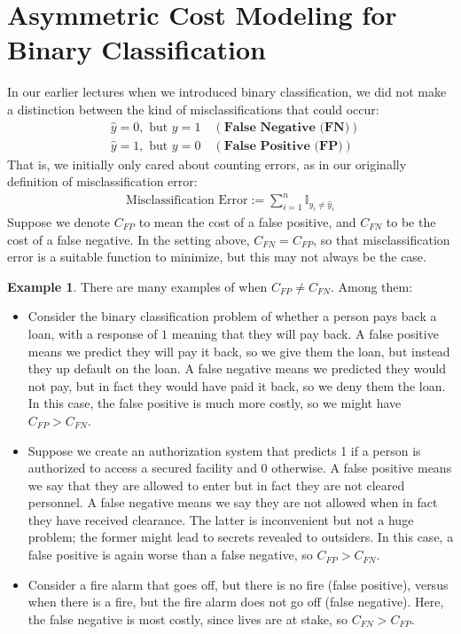 \documentclass[12pt, a4paper]{article}
\theoremstyle{definition}
\newtheorem*{example}{Example}
\begin{document}
	\section{Asymmetric Cost Modeling for Binary Classification}
	In our earlier lectures when we introduced binary classification, we did not
	make a distinction between the kind of misclassifications that could occur:
	\begin{align*}
		&\hat{y} = 0,\text{ but } y = 1\quad (\textbf{False Negative (FN)})\\
		&\hat{y} = 1,\text{ but } y = 0\quad (\textbf{False Positive (FP)})
	\end{align*}
	That is, we initially only cared about counting errors, as in our originally
	definition of misclassification error:
	\begin{align*}
		\text{Misclassification Error} := \sum_{i=1}^{n}\mathbb{I}_{y_i \neq \hat{y}_i}
	\end{align*}
	Suppose we denote $C_{FP}$ to mean the cost of a false positive, and $C_{FN}$
	to be the cost of a false negative. In the setting above, $C_{FN}=C_{FP}$, so
	that misclassification error is a suitable function to minimize, but this
	may not always be the case.
	\begin{tcolorbox}
		\begin{example}
			There are many examples of when $C_{FP}\neq C_{FN}$. Among them:
			\begin{itemize}
				\item Consider the binary classification problem of whether a person
				pays back a loan, with a response of $1$ meaning that they will
				pay back. A false positive means we predict they will pay it back,
				so we give them the loan, but instead they up default on the loan. A
				false negative means we predicted they would not pay, but in fact they
				would have paid it back, so we deny them the loan. In this case,
				the false positive is much more costly, so we might have
				$C_{FP} > C_{FN}$.
				\item Suppose we create an authorization system that predicts
				1 if a person is authorized to access a secured facility and 0
				otherwise. A false positive means we say that they are allowed
				to enter but in fact they are not cleared personnel. A false
				negative means we say they are not allowed when in fact they
				have received clearance. The latter is inconvenient but not
				a huge problem; the former might lead to secrets revealed to
				outsiders. In this case, a false positive is again worse than
				a false negative, so $C_{FP} > C_{FN}$.
				\item Consider a fire alarm that goes off, but there is no fire
				(false positive), versus when there is a fire, but the fire
				alarm does not go off (false negative). Here, the false negative
				is most costly, since lives are at stake, so $C_{FN} > C_{FP}$.
			\end{itemize}
		\end{example}
	\end{tcolorbox}
\end{document}
